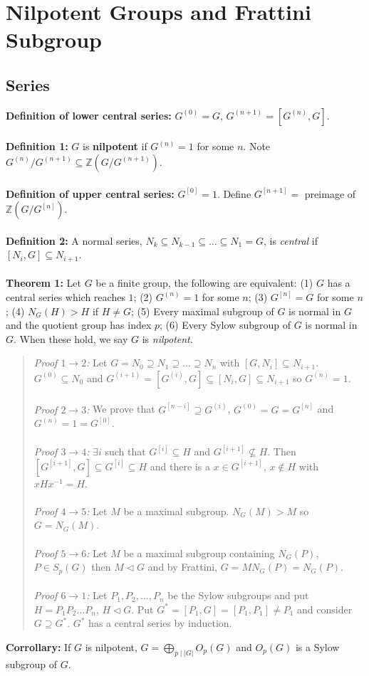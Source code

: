 \chapter{Nilpotent Groups and Frattini Subgroup}
\section{Series}
{\bf Definition of lower central series:} $G^{(0)}=G$, $G^{(n+1)} = [G^{(n)},G]$.
\\
\\
{\bf Definition 1:} $G$ is {\bf nilpotent} if
$G^{(n)}=1$ for some $n$.  Note $G^{(n)}/G^{(n+1)} \subseteq {\mathbb Z}(G/G^{(n+1)})$.
\\
\\
{\bf Definition of upper central series:}
$G^{[0]}=1$. Define $G^{[n+1]}= $ preimage of ${\mathbb Z}(G/G^{[n]})$.
\\
\\
{\bf Definition 2:}
A normal series, $N_k \subseteq N_{k-1} \subseteq  \ldots \subseteq N_1 = G$,
is \emph{central} if $[N_i , G] \subseteq N_{i+1}$.
\\
\\
{\bf Theorem 1:}  Let $G$ be a finite group, the following are equivalent:
(1) $G$ has a central series which reaches $1$;
(2) $G^{(n)} = 1$ for some $n$;
(3) $G^{[n]} = G$ for some $n$;
(4) $N_G(H) > H$ if $H \ne G$;
(5) Every maximal subgroup of $G$ is normal in $G$ and the quotient group has index $p$;
(6) Every Sylow subgroup of $G$ is normal in $G$.  When these hold, we say $G$ is
\emph {nilpotent}.
\begin{quote}
\emph{Proof $1 \rightarrow 2$:}
Let $G=N_0 \supseteq N_1 \supseteq \ldots \supseteq N_n$ with $[G, N_i] \subseteq N_{i+1}$.
$G^{(0)} \subseteq N_0$ and $G^{(i+1)}= [G^{(i)}, G] \subseteq [N_i, G] \subseteq N_{i+1}$
so $G^{(n)}=1$.
\\
\\
\emph{Proof $2 \rightarrow 3$:}
We prove that $G^{[n-i]} \supseteq G^{(i)}$, $G^{(0)}=G=G^{[n]}$ and $G^{(n)}=1=G^{[0]}$.
\\
\\
\emph{Proof $3 \rightarrow 4$:}
$\exists i$ such that $G^{[i]} \subseteq H$ and $G^{[i+1]} \nsubseteq H$.  Then
$[G^{[i+1]}, G] \subseteq G^{[i]} \subseteq H$ and there is a $x \in G^{[i+1]}$,
$x \notin H$ with $xHx^{-1}=H$.
\\
\\
\emph{Proof $4 \rightarrow 5$:}
Let $M$ be a maximal subgroup.  $N_G(M) > M$ so $G= N_G(M)$.
\\
\\
\emph{Proof $5 \rightarrow 6$:}
Let $M$ be a maximal subgroup containing $N_G(P)$, $P \in S_p(G)$ then $M \lhd G$ and
by Frattini, $G= M N_G(P)= N_G(P)$.
\\
\\
\emph{Proof $6 \rightarrow 1$:}
Let $P_1, P_2, \ldots, P_n$ be the Sylow subgroups and put $H= P_1 P_2 \ldots P_n$,
$H \lhd G$.  Put $G^*= [P_1, G]= [P_1, P_1] \ne P_1$ and consider
$G \supseteq G^*$.  $G^*$ has a central series by induction.
\end{quote}
{\bf Corrollary:}  If $G$ is nilpotent, $G= \bigoplus_{p \mid |G|} O_p(G)$ and 
$O_p(G)$ is a Sylow subgroup of $G$.
